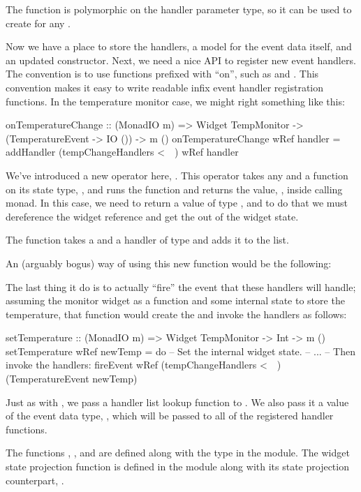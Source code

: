The  function is polymorphic on the handler parameter
type, so it can be used to create  for any .

Now we have a place to store the handlers, a model for the event data
itself, and an updated constructor.  Next, we need a nice API to
register new event handlers.  The  convention is to use
functions prefixed with ``on'', such as  and
.  This convention makes it easy to write readable
infix event handler registration functions.  In the temperature
monitor case, we might right something like this:

\begin{haskellcode}
 onTemperatureChange :: (MonadIO m) => Widget TempMonitor
                     -> (TemperatureEvent -> IO ())
                     -> m ()
 onTemperatureChange wRef handler =
   addHandler (tempChangeHandlers <~~) wRef handler
\end{haskellcode}

We've introduced a new operator here, \fw{<\string~\string~}.  This
operator takes any  and a function on its state type,
, and runs the function and returns the value, ,
inside calling monad.  In this case, we need to return a value of type
, and to do that we must dereference the
widget reference and get the  out of the widget
state.

The  function takes a  and a handler of
type  and adds it to the  list.

An (arguably bogus) way of using this new function would be the
following:


The last thing it do is to actually ``fire'' the event that these
handlers will handle; assuming the monitor widget as a
 function and some internal state to store the
temperature, that function would create the  and
invoke the handlers as follows:

\begin{haskellcode}
 setTemperature :: (MonadIO m) => Widget TempMonitor -> Int -> m ()
 setTemperature wRef newTemp = do
   -- Set the internal widget state.
   -- ...
   -- Then invoke the handlers:
   fireEvent wRef (tempChangeHandlers <~~) (TemperatureEvent newTemp)
\end{haskellcode}

Just as with , we pass a handler list lookup function
to .  We also pass it a value of the event data type,
, which will be passed to all of the registered handler
functions.

The functions , , and 
are defined along with the  type in the 
module.  The widget state projection function \fw{<\string~\string~}
is defined in the  module along with its 
state projection counterpart, \fw{<\string~}.
